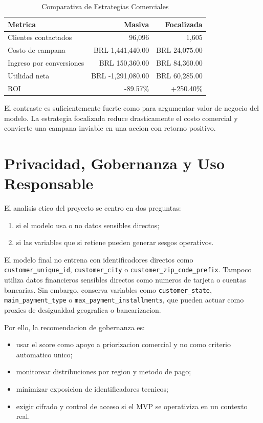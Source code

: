 \documentclass[12pt,letterpaper]{article}
\begin{document}
\begin{table}[h]
\centering
\caption{Comparativa de Estrategias Comerciales}
\label{tab:ext_roi}
\begin{tabular}{lrr}
\toprule
Metrica & Masiva & Focalizada \\
\midrule
Clientes contactados & 96,096 & 1,605 \\
Costo de campana & BRL 1,441,440.00 & BRL 24,075.00 \\
Ingreso por conversiones & BRL 150,360.00 & BRL 84,360.00 \\
Utilidad neta & BRL -1,291,080.00 & BRL 60,285.00 \\
ROI & -89.57\% & +250.40\% \\
\bottomrule
\end{tabular}
\end{table}

El contraste es suficientemente fuerte como para argumentar valor de negocio del modelo. La estrategia focalizada reduce drasticamente el costo comercial y convierte una campana inviable en una accion con retorno positivo.

\section{Privacidad, Gobernanza y Uso Responsable}
El analisis etico del proyecto se centro en dos preguntas:
\begin{enumerate}[label=\arabic*.]
    \item si el modelo usa o no datos sensibles directos;
    \item si las variables que si retiene pueden generar sesgos operativos.
\end{enumerate}

El modelo final no entrena con identificadores directos como \texttt{customer\_unique\_id}, \texttt{customer\_city} o \texttt{customer\_zip\_code\_prefix}. Tampoco utiliza datos financieros sensibles directos como numeros de tarjeta o cuentas bancarias. Sin embargo, conserva variables como \texttt{customer\_state}, \texttt{main\_payment\_type} o \texttt{max\_payment\_installments}, que pueden actuar como proxies de desigualdad geografica o bancarizacion.

Por ello, la recomendacion de gobernanza es:
\begin{itemize}
    \item usar el score como apoyo a priorizacion comercial y no como criterio automatico unico;
    \item monitorear distribuciones por region y metodo de pago;
    \item minimizar exposicion de identificadores tecnicos;
    \item exigir cifrado y control de acceso si el MVP se operativiza en un contexto real.
\end{itemize}
\end{document}
